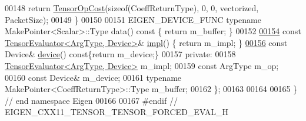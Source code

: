 \begin{DoxyCode}
00148     \textcolor{keywordflow}{return} \hyperlink{class_eigen_1_1_tensor_op_cost}{TensorOpCost}(\textcolor{keyword}{sizeof}(CoeffReturnType), 0, 0, vectorized, PacketSize);
00149   \}
00150 
00151   EIGEN\_DEVICE\_FUNC \textcolor{keyword}{typename} MakePointer<Scalar>::Type data()\textcolor{keyword}{ const }\{ \textcolor{keywordflow}{return} m\_buffer; \}
00152 
\hyperlink{struct_eigen_1_1_tensor_evaluator_3_01const_01_tensor_forced_eval_op_3_01_arg_type_00_01_make_pointer___01_4_00_01_device_01_4_ab3202fdd99e83bf2bd678ef11d37341e}{00154}   \textcolor{keyword}{const} \hyperlink{struct_eigen_1_1_tensor_evaluator}{TensorEvaluator<ArgType, Device>}& \hyperlink{struct_eigen_1_1_tensor_evaluator_3_01const_01_tensor_forced_eval_op_3_01_arg_type_00_01_make_pointer___01_4_00_01_device_01_4_ab3202fdd99e83bf2bd678ef11d37341e}{impl}() \{ \textcolor{keywordflow}{return} m\_impl; \}
\hyperlink{struct_eigen_1_1_tensor_evaluator_3_01const_01_tensor_forced_eval_op_3_01_arg_type_00_01_make_pointer___01_4_00_01_device_01_4_a8cfc74b439783ec96b54f9a34a101b5f}{00156}   \textcolor{keyword}{const} Device& \hyperlink{struct_eigen_1_1_tensor_evaluator_3_01const_01_tensor_forced_eval_op_3_01_arg_type_00_01_make_pointer___01_4_00_01_device_01_4_a8cfc74b439783ec96b54f9a34a101b5f}{device}()\textcolor{keyword}{ const}\{\textcolor{keywordflow}{return} m\_device;\}
00157  \textcolor{keyword}{private}:
00158   \hyperlink{struct_eigen_1_1_tensor_evaluator}{TensorEvaluator<ArgType, Device>} m\_impl;
00159   \textcolor{keyword}{const} ArgType m\_op;
00160   \textcolor{keyword}{const} Device& m\_device;
00161   \textcolor{keyword}{typename} MakePointer<CoeffReturnType>::Type m\_buffer;
00162 \};
00163 
00164 
00165 \} \textcolor{comment}{// end namespace Eigen}
00166 
00167 \textcolor{preprocessor}{#endif // EIGEN\_CXX11\_TENSOR\_TENSOR\_FORCED\_EVAL\_H}
\end{DoxyCode}
